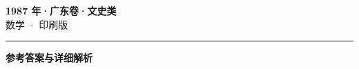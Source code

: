 \documentclass[zihao=5, a4paper]{ctexart}
\begin{document}
\begin{center}
  {\Large\bfseries 1987 年·广东卷·文史类}\\[4pt]
  {\large 数学 · 印刷版}
\end{center}
\medskip
{}

\par\bigskip\hrule\bigskip
{}
\begin{center}{\large\bfseries 参考答案与详细解析}\end{center}
\smallskip

\end{document}
